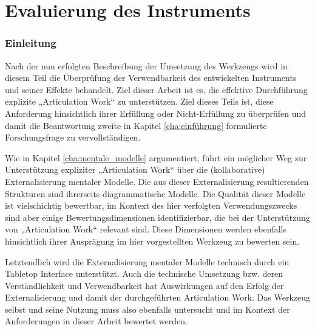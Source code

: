 \part{Evaluierung des Instruments} %
\label{prt:evaluierung}

\section*{Einleitung} %
\label{sec:evaluierung_einleitung}
\thispagestyle{empty}


Nach der nun erfolgten Beschreibung der Umsetzung des Werkzeugs wird in diesem Teil die Überprüfung der Verwendbarkeit des entwickelten Instruments und seiner Effekte behandelt. Ziel dieser Arbeit ist es, die effektive Durchführung explizite „Articulation Work“ zu unterstützen. Ziel dieses Teils ist, diese Anforderung hinsichtlich ihrer Erfüllung oder Nicht-Erfüllung zu überprüfen und damit die Beantwortung zweite in Kapitel \ref{cha:einführung} formulierte Forschungsfrage zu vervollständigen.

Wie in Kapitel \ref{cha:mentale_modelle} argumentiert, führt ein möglicher Weg zur Unterstützung expliziter „Articulation Work“ über die (kollaborative) Externalisierung mentaler Modelle. Die aus dieser Externalisierung resultierenden Strukturen sind ihrerseits diagrammatische Modelle. Die Qualität dieser Modelle ist vielschichtig bewertbar, im Kontext des hier verfolgten Verwendungszwecks sind aber einige Bewertungsdimensionen identifizierbar, die bei der Unterstützung von „Articulation Work“ relevant sind. Diese Dimensionen werden ebenfalls hinsichtlich ihrer Ausprägung im hier vorgestellten Werkzeug zu bewerten sein. 

Letztendlich wird die Externalisierung mentaler Modelle technisch durch ein Tabletop Interface unterstützt. Auch die technische Umsetzung bzw. deren Verständlichkeit und Verwendbarkeit hat Auswirkungen auf den Erfolg der Externalisierung und damit der durchgeführten Articulation Work. Das Werkzeug selbst und seine Nutzung muss also ebenfalls untersucht und im Kontext der Anforderungen in dieser Arbeit bewertet werden. 

